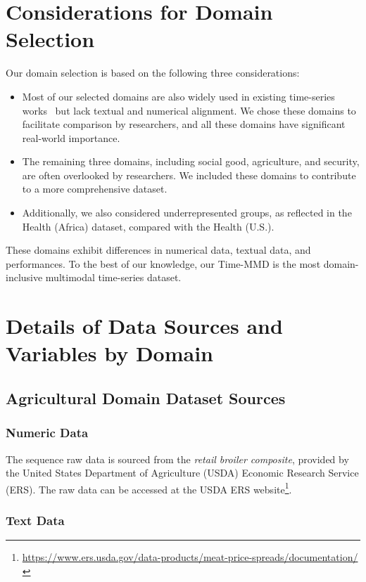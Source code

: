 \section{Considerations for Domain Selection}\label{app:domain}
Our domain selection is based on the following three considerations:
\begin{itemize}
    \item Most of our selected domains are also widely used in existing time-series works~\cite{liutimer,ansari2024chronos,dasdecoder,woounified}
 but lack textual and numerical alignment. We chose these domains to facilitate comparison by researchers, and all these domains have significant real-world importance.
    \item The remaining three domains, including social good, agriculture, and security, are often overlooked by researchers. We included these domains to contribute to a more comprehensive dataset.
    \item Additionally, we also considered underrepresented groups, as reflected in the Health (Africa) dataset, compared with the Health (U.S.).
\end{itemize}
These domains exhibit differences in numerical data, textual data, and performances. To the best of our knowledge, our Time-MMD is the most domain-inclusive multimodal time-series dataset. 

\section{Details of Data Sources and Variables by Domain}\label{app:data source}
\subsection{Agricultural Domain Dataset Sources}


\subsubsection{Numeric Data}
The sequence raw data is sourced from the \textit{retail broiler composite}, provided by the United States Department of Agriculture (USDA) Economic Research Service (ERS). The raw data can be accessed at the USDA ERS website\footnote{\url{https://www.ers.usda.gov/data-products/meat-price-spreads/documentation/}}.

\subsubsection{Text Data}
